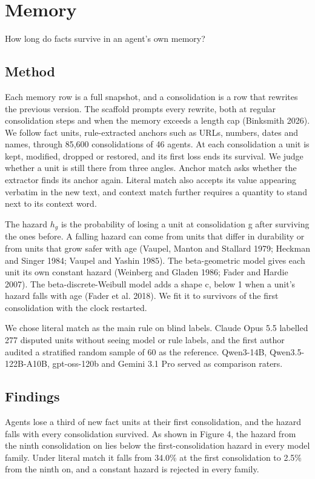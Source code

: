 \documentclass{arxivtmpl}
\begin{document}
\section{Memory}

How long do facts survive in an agent's own memory?

\subsection{Method}

Each memory row is a full snapshot, and a consolidation is a row that rewrites the previous version. The scaffold prompts every rewrite, both at regular consolidation steps and when the memory exceeds a length cap (Binksmith 2026). We follow fact units, rule-extracted anchors such as URLs, numbers, dates and names, through 85,600 consolidations of 46 agents. At each consolidation a unit is kept, modified, dropped or restored, and its first loss ends its survival. We judge whether a unit is still there from three angles. Anchor match asks whether the extractor finds its anchor again. Literal match also accepts its value appearing verbatim in the new text, and context match further requires a quantity to stand next to its context word.

The hazard $h_g$ is the probability of losing a unit at consolidation g after surviving the ones before. A falling hazard can come from units that differ in durability or from units that grow safer with age (Vaupel, Manton and Stallard 1979; Heckman and Singer 1984; Vaupel and Yashin 1985). The beta-geometric model gives each unit its own constant hazard (Weinberg and Gladen 1986; Fader and Hardie 2007). The beta-discrete-Weibull model adds a shape c, below 1 when a unit's hazard falls with age (Fader et al. 2018). We fit it to survivors of the first consolidation with the clock restarted.

We chose literal match as the main rule on blind labels. Claude Opus 5.5 labelled 277 disputed units without seeing model or rule labels, and the first author audited a stratified random sample of 60 as the reference. Qwen3-14B, Qwen3.5-122B-A10B, gpt-oss-120b and Gemini 3.1 Pro served as comparison raters.

\subsection{Findings}

Agents lose a third of new fact units at their first consolidation, and the hazard falls with every consolidation survived. As shown in Figure 4, the hazard from the ninth consolidation on lies below the first-consolidation hazard in every model family. Under literal match it falls from 34.0\% at the first consolidation to 2.5\% from the ninth on, and a constant hazard is rejected in every family.
\end{document}
